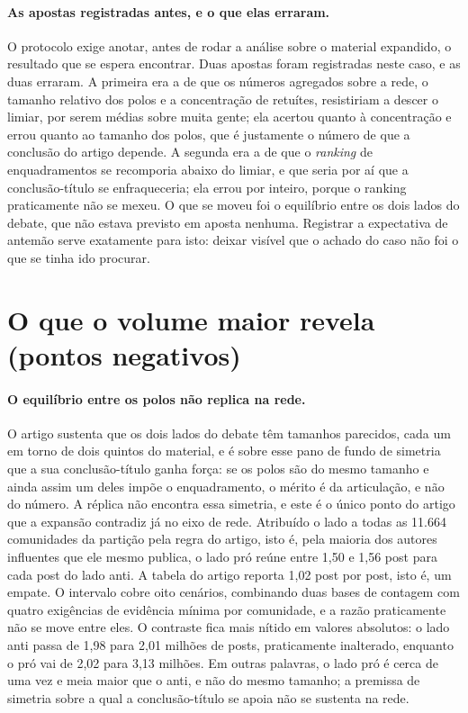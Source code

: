 \paragraph{As apostas registradas antes, e o que elas erraram.} O protocolo exige
anotar, antes de rodar a análise sobre o material expandido, o resultado que se
espera encontrar. Duas apostas foram registradas neste caso, e as duas erraram. A
primeira era a de que os números agregados sobre a rede, o tamanho relativo dos
polos e a concentração de retuítes, resistiriam a descer o limiar, por serem médias
sobre muita gente; ela acertou quanto à concentração e errou quanto ao tamanho dos
polos, que é justamente o número de que a conclusão do artigo depende. A segunda
era a de que o \emph{ranking} de enquadramentos se recomporia abaixo do limiar, e
que seria por aí que a conclusão-título se enfraqueceria; ela errou por inteiro,
porque o ranking praticamente não se mexeu. O que se moveu foi o equilíbrio entre
os dois lados do debate, que não estava previsto em aposta nenhuma. Registrar a
expectativa de antemão serve exatamente para isto: deixar visível que o achado do
caso não foi o que se tinha ido procurar.

\section{O que o volume maior revela (pontos negativos)}

\paragraph{O equilíbrio entre os polos não replica na rede.} O artigo sustenta que
os dois lados do debate têm tamanhos parecidos, cada um em torno de dois quintos do
material, e é sobre esse pano de fundo de simetria que a sua conclusão-título ganha
força: se os polos são do mesmo tamanho e ainda assim um deles impõe o
enquadramento, o mérito é da articulação, e não do número. A réplica não encontra
essa simetria, e este é o único ponto do artigo que a expansão contradiz já no eixo
de rede. Atribuído o lado a todas as
11.664 comunidades da partição pela regra do artigo, isto é, pela maioria dos autores
influentes que ele mesmo publica, o lado pró reúne entre 1,50 e 1,56 post para cada
post do lado anti. A tabela do artigo reporta 1,02 post por post, isto é, um
empate. O
intervalo cobre oito cenários, combinando duas bases de contagem com quatro
exigências de evidência mínima por comunidade, e a razão praticamente não se move
entre eles. O contraste fica mais nítido
em valores absolutos: o lado anti passa de 1,98 para 2,01 milhões de posts,
praticamente inalterado, enquanto o pró vai de 2,02 para 3,13 milhões. Em outras
palavras, o lado pró é cerca de uma vez e meia maior que o anti, e não do mesmo
tamanho; a premissa de simetria sobre a qual a conclusão-título se apoia não se
sustenta na rede.


